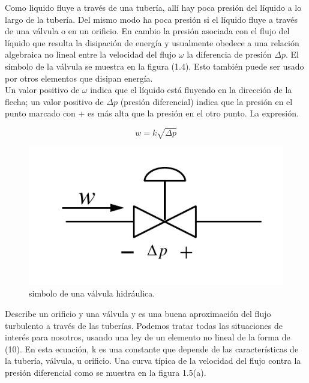 \documentclass[a4paper,12pt,twoside]{proyectotanquesecci}
\begin{document}
Como liquido fluye a través de una tubería, allí hay poca presión del líquido a lo largo de la tubería. Del mismo modo ha poca presión si el líquido fluye a través de una válvula o en un orificio. En cambio la presión asociada con el flujo del líquido que resulta la disipación de energía  y usualmente obedece a una relación algebraica no lineal entre la velocidad del flujo $\omega$ la diferencia de presión $\Delta p$. El símbolo de la válvula se muestra en la figura (1.4). Esto también puede ser usado por otros elementos que disipan energía. \\

Un valor positivo de $\omega$ indica que el líquido está fluyendo en la dirección de la flecha; un valor positivo de $\Delta p$ (presión diferencial) indica que la presión en el punto marcado con + es más alta que la presión en el otro punto. La expresión.

\begin{equation}
w=k\sqrt{\Delta p}
\end{equation}

\begin{figure}[h]
\centering
\includegraphics[scale=0.5]{Figura4}
\renewcommand{\figurename}{Fig.}
\caption{simbolo de una válvula hidráulica.}
\label{simbolo de una válvula hidráulica.}
\end{figure}

Describe un orificio y una válvula y es una buena aproximación del flujo turbulento a través de las tuberías. Podemos tratar todas las situaciones de interés para nosotros, usando una ley de un elemento no lineal de la forma de (10). En esta ecuación, k es una constante que depende de las características de la tubería, válvula, u orificio. Una curva típica de la velocidad del flujo contra la presión diferencial como se muestra en la figura 1.5(a).
\end{document}
